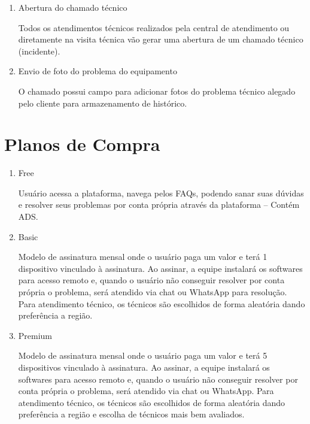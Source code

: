 \documentclass[
    12pt,               %
    openright,          %
    oneside,
    a4paper,            %
    english,            %
    brazil              %
   ]{ifsp-spo-inf-ctds}
\begin{document}
	\begin{enumerate}
		
		\item
		Abertura do chamado técnico
		
		Todos os atendimentos técnicos realizados pela central de atendimento ou diretamente na visita técnica vão gerar uma abertura de um chamado técnico (incidente).
		
		\item
		Envio de foto do problema do equipamento
		
		O chamado possui campo para adicionar fotos do problema técnico alegado pelo cliente para armazenamento de histórico.
		
	\end{enumerate}

\section{Planos de Compra}

	\begin{enumerate}
		
		\item
		Free
		
		Usuário acessa a plataforma, navega pelos FAQs, podendo sanar suas dúvidas e resolver seus problemas por conta própria através da plataforma – Contém ADS.
		
		\item
		Basic
		
		Modelo de assinatura mensal onde o usuário paga um valor e terá 1 dispositivo vinculado à assinatura. Ao assinar, a equipe instalará os softwares para acesso remoto e, quando o usuário não conseguir resolver por conta própria o problema, será atendido via chat ou WhatsApp para resolução. Para atendimento técnico, os técnicos são escolhidos de forma aleatória dando preferência a região.
		
		\item
		Premium
		
		Modelo de assinatura mensal onde o usuário paga um valor e terá 5 dispositivos vinculado à assinatura. Ao assinar, a equipe instalará os softwares para acesso remoto e, quando o usuário não conseguir resolver por conta própria o problema, será atendido via chat ou WhatsApp. Para atendimento técnico, os técnicos são escolhidos de forma aleatória dando preferência a região e escolha de técnicos mais bem avaliados.
		
	\end{enumerate}
\end{document}
